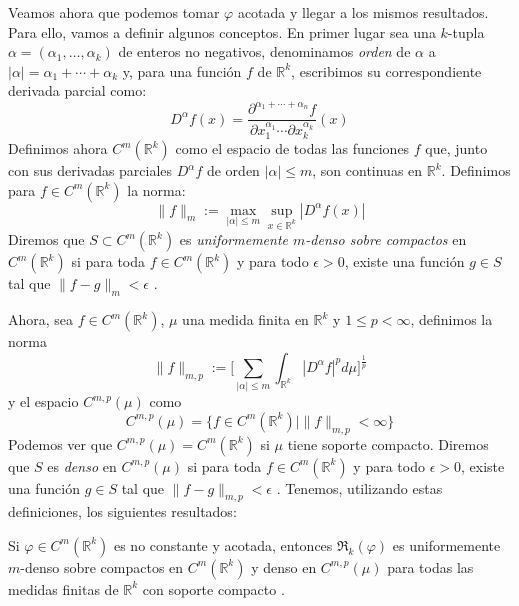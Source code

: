 Veamos ahora que podemos tomar $\varphi$ acotada y llegar a los mismos resultados. Para ello, vamos a definir algunos
conceptos. En primer lugar sea una $k$-tupla $\alpha=(\alpha_1,\dots,\alpha_k)$ de enteros no negativos, denominamos
\textit{orden} de $\alpha$ a $|\alpha|=\alpha_1+\cdots +\alpha_k$ y, para una función $f$ de $\mathbb{R}^k$, escribimos
su correspondiente derivada parcial como:
\begin{equation}
    D^\alpha f(x)=\frac{\partial^{\alpha_1+\cdots+\alpha_n}f}{\partial x_1^{\alpha_1}\cdots\partial x_k^{\alpha_k}}(x)
\end{equation}
Definimos ahora $C^m(\mathbb{R}^k)$ como el espacio de todas las funciones $f$ que, junto con sus derivadas parciales 
$D^\alpha f$ de orden $|\alpha|\leq m$, son continuas en $\mathbb{R}^k$. Definimos para $f\in C^m(\mathbb{R}^k)$ la
norma:
\begin{equation}
    \|f\|_{m}:=\max_{|\alpha|\leq m}\sup_{x\in\mathbb{R}^k}|D^\alpha f(x)|
\end{equation}
Diremos que $S\subset C^m(\mathbb{R}^k)$ es \textit{uniformemente $m$-denso sobre compactos} en $C^m(\mathbb{R}^k)$ si
para toda $f\in C^m(\mathbb{R}^k)$ y para todo $\epsilon>0$, existe una función $g\in S$ tal que $\|f-g\|_m<\epsilon$
\cite{hornik_1991}.

\vspace{10pt}
Ahora, sea $f\in  C^m(\mathbb{R}^k)$, $\mu$ una medida finita en $\mathbb{R}^k$ y $1\leq p<\infty$, definimos la norma
\begin{equation}
    \|f\|_{m,p}:=\Big[\sum_{|\alpha|\leq m}\int_{\mathbb{R}^k}|D^\alpha f|^pd\mu\Big]^{\frac 1p}
\end{equation}
y el espacio $C^{m,p}(\mu)$ como
\begin{equation}
    C^{m,p}(\mu)=\{f\in C^m(\mathbb{R}^k)\mid \|f\|_{m,p}<\infty\}
\end{equation}
Podemos ver que $C^{m,p}(\mu)=C^m(\mathbb{R}^k)$ si $\mu$ tiene soporte compacto. Diremos que $S$ es \textit{denso} en
$C^{m,p}(\mu)$ si para toda $f\in C^m(\mathbb{R}^k)$ y para todo $\epsilon>0$, existe una función $g\in S$ tal que
$\|f-g\|_{m,p}<\epsilon$ \cite{hornik_1991}. Tenemos, utilizando estas definiciones, los siguientes resultados:

\begin{teorema}Si $\varphi\in C^m(\mathbb{R}^k)$ es no constante y acotada, entonces $\mathfrak{R}_k(\varphi)$ es
uniformemente $m$-denso sobre compactos en $C^m(\mathbb{R}^k)$ y denso en $C^{m,p}(\mu)$ para todas las medidas finitas
de $\mathbb{R}^k$ con soporte compacto \cite{hornik_1991}.
\end{teorema}

